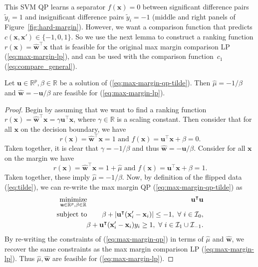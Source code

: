 \documentclass[twoside,11pt]{article}
\newcommand{\RR}{\mathbb R}
\DeclareMathOperator*{\minimize}{minimize}
\begin{document}
This SVM QP learns a separator $f(\mathbf x)=0$ between significant
difference pairs $\tilde y_i=1$ and insignificant difference pairs
$\tilde y_i=-1$ (middle and right panels of
Figure~\ref{fig:hard-margin}). However, we want a comparison function
that predicts $c(\mathbf x,\mathbf x')\in\{-1,0,1\}$. So we use the
next lemma to construct a ranking function $r(\mathbf x)= \mathbf{\hat
  w}^\intercal \mathbf x$ that is feasible for the original max margin
comparison LP (\ref{eq:max-margin-lp}), and can be used with the
comparison function~$c_1$ (\ref{eq:compare_general}).
\begin{lemma}
  Let $\mathbf u\in\RR^p,\beta\in\RR$ be a solution of
  (\ref{eq:max-margin-qp-tilde}). Then $\hat \mu = -1/\beta$ and
  $\mathbf{\hat w} = -\mathbf u/\beta$ are feasible for
  (\ref{eq:max-margin-lp}).
  \label{lemma:feasible}
\end{lemma}
\begin{proof}
  Begin by assuming that we want to find a ranking function $r(\mathbf
  x)=\mathbf{\hat w}^\intercal \mathbf x = \gamma \mathbf u^\intercal
  \mathbf x$, where $\gamma\in\RR$ is a scaling constant. Then
  consider that for all $\mathbf x$ on the decision boundary, we have
  \begin{equation}
    \label{eq:dec-boundary-rank}
    r(\mathbf x) = \mathbf{\hat w}^\intercal \mathbf x = 1\text{ and } 
    f(\mathbf x) = \mathbf u^\intercal \mathbf x + \beta = 0.
  \end{equation}
  Taken together, it is clear that $\gamma=-1/\beta$ and thus
  $\mathbf{\hat w} = -\mathbf u/\beta$. Consider for all $\mathbf x$ on the
  margin we have
  \begin{equation}
    \label{eq:margin-rank}
    r(\mathbf x) = \mathbf{\hat w}^\intercal \mathbf x = 1+\hat\mu\text{ and } 
    f(\mathbf x) = \mathbf u^\intercal \mathbf x + \beta= 1.
  \end{equation}
  Taken together, these imply $\hat \mu=-1/\beta$. Now, by definition
  of the flipped data (\ref{eq:tilde}), we can re-write the max margin
  QP (\ref{eq:max-margin-qp-tilde}) as
\begin{eqnarray}
  \label{eq:max-margin-qp}
    \minimize_{\mathbf u\in\RR^p, \beta\in\RR}\ &&
    \hskip -0.5cm \mathbf u^\intercal \mathbf u  \\
    \text{subject to}\ &&\hskip -0.5cm
    \nonumber \beta + |\mathbf u^\intercal (\mathbf x_i'-\mathbf x_i)| \leq -1,\
    \forall\  i\in \mathcal I_0,\\
    &&\hskip -0.5cm
\nonumber \beta + \mathbf u^\intercal(\mathbf x_i'-\mathbf x_i)y_i \geq 1,
\ \forall\ i \in \mathcal I_1\cup \mathcal I_{-1}.
\end{eqnarray}
By re-writing the constraints of (\ref{eq:max-margin-qp}) in terms of
$\hat \mu$ and $\mathbf{\hat w}$, we recover the same constraints as
the max margin comparison LP (\ref{eq:max-margin-lp}). Thus $\hat \mu,
\mathbf{\hat w}$ are feasible for (\ref{eq:max-margin-lp}).
\end{proof}
\end{document}
